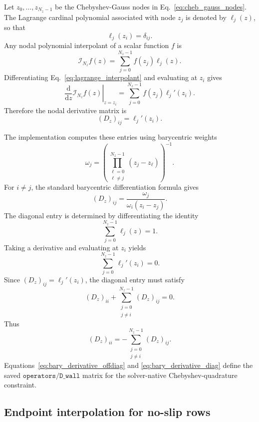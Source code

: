 \documentclass[11pt]{article}
\newcommand{\dd}{\mathrm{d}}
\newcommand{\Dz}{D_z}
\begin{document}
Let \(z_0,\ldots,z_{N_z-1}\) be the Chebyshev-Gauss nodes in
Eq.~\eqref{eq:cheb_gauss_nodes}. The Lagrange cardinal polynomial associated
with node \(z_j\) is denoted by \(\ell_j(z)\), so that
\[
  \ell_j(z_i)=\delta_{ij}.
\]
Any nodal polynomial interpolant of a scalar function \(f\) is
\begin{equation}
  \mathcal{I}_{N_z}f(z)
  =
  \sum_{j=0}^{N_z-1} f(z_j)\ell_j(z).
  \label{eq:lagrange_interpolant}
\end{equation}
Differentiating Eq.~\eqref{eq:lagrange_interpolant} and evaluating at
\(z_i\) gives
\begin{equation}
  \left.\frac{\dd}{\dd z}\mathcal{I}_{N_z}f(z)\right|_{z=z_i}
  =
  \sum_{j=0}^{N_z-1} f(z_j)\ell_j'(z_i).
  \label{eq:derivative_from_lagrange}
\end{equation}
Therefore the nodal derivative matrix is
\[
  (\Dz)_{ij}=\ell_j'(z_i).
\]

The implementation computes these entries using barycentric weights
\begin{equation}
  \omega_j =
  \left(\prod_{\substack{\ell=0\\ \ell\ne j}}^{N_z-1}
  (z_j-z_\ell)\right)^{-1}.
  \label{eq:bary_weights}
\end{equation}
For \(i\ne j\), the standard barycentric differentiation formula gives
\begin{equation}
  (\Dz)_{ij}
  =
  \frac{\omega_j}{\omega_i(z_i-z_j)}.
  \label{eq:bary_derivative_offdiag}
\end{equation}
The diagonal entry is determined by differentiating the identity
\[
  \sum_{j=0}^{N_z-1}\ell_j(z)=1.
\]
Taking a derivative and evaluating at \(z_i\) yields
\[
  \sum_{j=0}^{N_z-1}\ell_j'(z_i)=0.
\]
Since \((\Dz)_{ij}=\ell_j'(z_i)\), the diagonal entry must satisfy
\[
  (\Dz)_{ii} + \sum_{\substack{j=0\\j\ne i}}^{N_z-1}(\Dz)_{ij}=0.
\]
Thus
\begin{equation}
  (\Dz)_{ii}
  =
  -\sum_{\substack{j=0\\j\ne i}}^{N_z-1}(\Dz)_{ij}.
  \label{eq:bary_derivative_diag}
\end{equation}
Equations~\eqref{eq:bary_derivative_offdiag} and
\eqref{eq:bary_derivative_diag} define the saved
\(\texttt{operators/D\_wall}\) matrix for the solver-native
Chebyshev-quadrature constraint.

\subsection{Endpoint interpolation for no-slip rows}
\end{document}
